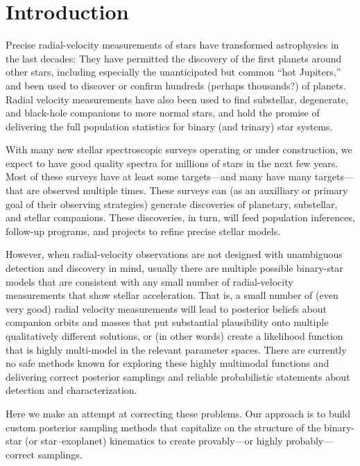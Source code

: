 \documentclass[12pt, preprint]{aastex6}
\begin{document}

\section{Introduction} \label{sec:intro}

Precise radial-velocity measurements of stars have transformed
astrophysics in the last decades:
They have permitted the discovery of the first planets around other stars,
including especially the unanticipated but common ``hot Jupiters,''
and been used to discover or confirm hundreds
(perhaps thousands?) of planets.
Radial velocity measurements have also been used to find substellar,
degenerate, and black-hole companions to more normal stars, and hold
the promise of delivering the full population statistics for binary
(and trinary) star systems.

With many new stellar spectroscopic surveys operating or under
construction, we expect to have good quality spectra for millions
of stars in the next few years.
Most of these surveys have at least some targets---and many have many
targets---that are observed multiple times.
These surveys can (as an auxilliary or primary goal of their observing
strategies) generate discoveries of planetary, substellar, and stellar
companions.
These discoveries, in turn, will feed population inferences, follow-up
programs, and projects to refine precise stellar models.

However, when radial-velocity observations are not designed with
unambiguous detection and discovery in mind, usually there are
multiple possible binary-star models that are consistent with any
small number of radial-velocity measurements that show stellar
acceleration.
That is, a small number of (even very good) radial velocity
measurements will lead to posterior beliefs about companion orbits and
masses that put substantial plausibility onto multiple qualitatively
different solutions, or (in other words) create a likelihood function
that is highly multi-model in the relevant parameter spaces.
There are currently no safe methods known for exploring these highly
multimodal functions and delivering correct posterior samplings and
reliable probabilistic statements about detection and
characterization.

Here we make an attempt at correcting these problems.
Our approach is to build custom posterior sampling methods that
capitalize on the structure of the binary-star (or star--exoplanet)
kinematics to create provably---or highly probably---correct
samplings.
\end{document}

